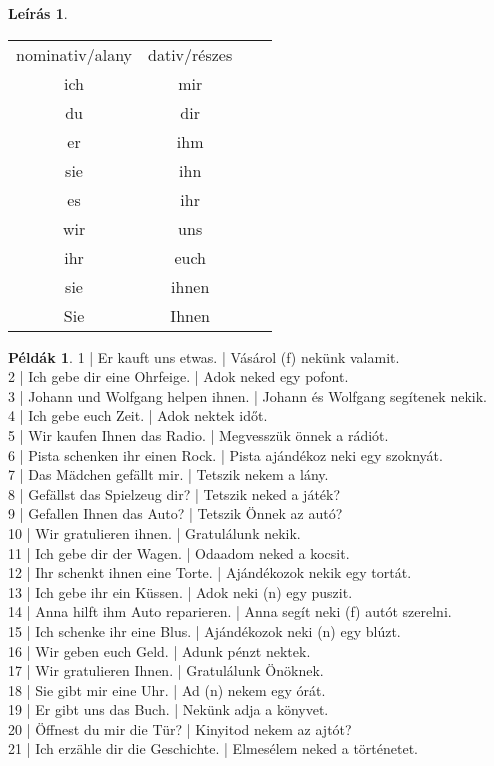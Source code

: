 \documentclass{article}
\theoremstyle{definition}
\newtheorem*{exmp}{Példák}
\newtheorem*{desc}{Leírás}
\begin{document}
\begin{desc}
\begin{tabular}{cccc}
 nominativ/alany & dativ/részes \\
 ich & mir \\
 du & dir \\
 er & ihm \\
 sie & ihn \\
 es & ihr \\
 wir & uns \\
 ihr & euch \\
 sie & ihnen \\
 Sie & Ihnen \\
\end{tabular}
\end{desc}

\begin{exmp}
1 | Er kauft uns etwas. | Vásárol (f) nekünk valamit.\\
2 | Ich gebe dir eine Ohrfeige. | Adok neked egy pofont.\\
3 | Johann und Wolfgang helpen ihnen. | Johann és Wolfgang segítenek nekik.\\
4 | Ich gebe euch Zeit. | Adok nektek időt.\\
5 | Wir kaufen Ihnen das Radio. | Megvesszük önnek a rádiót.\\
6 | Pista schenken ihr einen Rock. | Pista ajándékoz neki egy szoknyát.\\
7 | Das Mädchen gefällt mir. | Tetszik nekem a lány.\\
8 | Gefällst das Spielzeug dir? | Tetszik neked a játék?\\
9 | Gefallen Ihnen das Auto? | Tetszik Önnek az autó?\\
10 | Wir gratulieren ihnen. | Gratulálunk nekik.\\
11 | Ich gebe dir der Wagen. | Odaadom neked a kocsit.\\
12 | Ihr schenkt ihnen eine Torte. | Ajándékozok nekik egy tortát.\\
13 | Ich gebe ihr ein Küssen. | Adok neki (n) egy puszit.\\
14 | Anna hilft ihm Auto reparieren. | Anna segít neki (f) autót szerelni.\\
15 | Ich schenke ihr eine Blus. | Ajándékozok neki (n) egy blúzt.\\
16 | Wir geben euch Geld. | Adunk pénzt nektek.\\
17 | Wir gratulieren Ihnen. | Gratulálunk Önöknek.\\
18 | Sie gibt mir eine Uhr. | Ad (n) nekem egy órát.\\
19 | Er gibt uns das Buch. | Nekünk adja a könyvet.\\
20 | Öffnest du mir die Tür? | Kinyitod nekem az ajtót?\\
21 | Ich erzähle dir die Geschichte. | Elmesélem neked a történetet.\\
\end{exmp}
\end{document}

